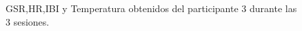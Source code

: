 \begin{figure}[h]
        \centering
        \caption{GSR,HR,IBI y Temperatura obtenidos del participante 3 durante las 3 sesiones.}\label{fig:data_p3}
\end{figure}
\pagebreak

